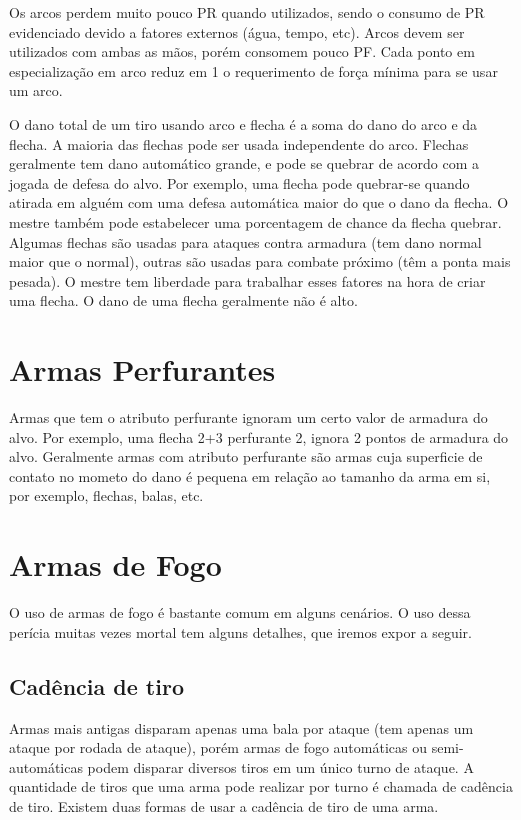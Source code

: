 Os arcos perdem muito pouco PR quando utilizados, sendo o consumo de PR evidenciado devido a fatores externos (água, tempo, etc). Arcos devem ser utilizados com ambas as mãos, porém consomem pouco PF. Cada ponto em especialização em arco reduz em 1 o requerimento de força mínima para se usar um arco.  
 
O dano total de um tiro usando arco e flecha é a soma do dano do arco e da flecha. A maioria das flechas pode ser usada independente do arco. Flechas geralmente tem dano automático grande, e pode se quebrar de acordo com a jogada de defesa do alvo. Por exemplo, uma flecha pode quebrar-se quando atirada em alguém com uma defesa automática maior do que o dano da flecha. O mestre também pode estabelecer uma porcentagem de chance da flecha quebrar. Algumas flechas são usadas para ataques contra armadura (tem dano normal maior que o normal), outras são usadas para combate próximo (têm a ponta mais pesada). O mestre tem liberdade para trabalhar esses fatores na hora de criar uma flecha. O dano de uma flecha geralmente não é alto.

\section{Armas Perfurantes}

Armas que tem o atributo perfurante ignoram um certo valor de armadura do alvo. Por exemplo, uma flecha 2+3 perfurante 2, ignora 2 pontos de armadura do alvo. 
Geralmente armas com atributo perfurante são armas cuja superficie de contato no mometo do dano é pequena em relação ao tamanho da arma em si, por exemplo, flechas, balas, etc.


\section{Armas de Fogo}

O uso de armas de fogo é bastante comum em alguns cenários. O uso dessa perícia muitas vezes mortal tem alguns detalhes, que iremos expor a seguir.

\subsection{Cadência de tiro}
 
Armas mais antigas disparam apenas uma bala por ataque (tem apenas um ataque por rodada de ataque), porém armas de fogo automáticas ou semi-automáticas podem disparar diversos tiros em um único turno de ataque. A quantidade de tiros que uma arma pode realizar por turno é chamada de cadência de tiro. Existem duas formas de usar a cadência de tiro de uma arma. 

